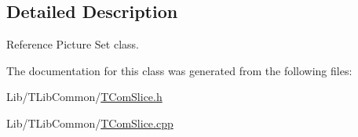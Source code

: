 \subsection{Detailed Description}
Reference Picture Set class. 

The documentation for this class was generated from the following files\+:\begin{DoxyCompactItemize}
\item 
Lib/\+T\+Lib\+Common/\hyperlink{_t_com_slice_8h}{T\+Com\+Slice.\+h}\item 
Lib/\+T\+Lib\+Common/\hyperlink{_t_com_slice_8cpp}{T\+Com\+Slice.\+cpp}\end{DoxyCompactItemize}
